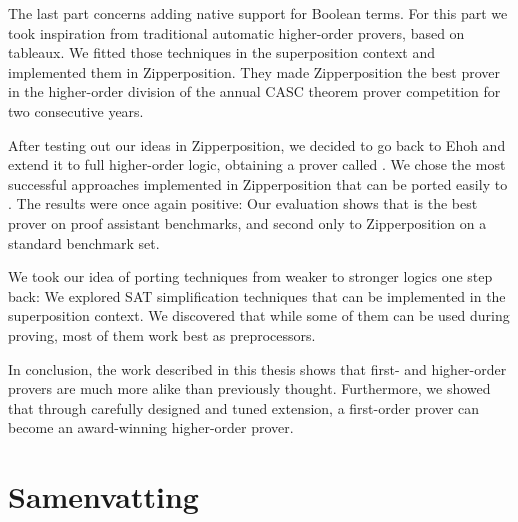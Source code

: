 The last part concerns adding native support for
Boolean terms. For this part we took inspiration from traditional
automatic higher-order provers, based on tableaux. We fitted those techniques in the
superposition context and implemented them in Zipperposition. They
made Zipperposition the best prover in the higher-order division of the annual CASC
theorem prover competition for two consecutive years.

After testing out our ideas in Zipperposition, we decided to go back to Ehoh and
extend it to full higher-order logic, obtaining a prover called \ehohii{}. We
chose the most successful approaches implemented in Zipperposition that can
be ported easily to \ehohii{}. The results were once again positive: Our
evaluation shows that \ehohii{} is the best prover on proof assistant
benchmarks, and second only to Zipperposition on a standard benchmark set.

We took our idea of porting techniques from weaker to stronger logics one step
back: We explored SAT simplification techniques that can be implemented in the
superposition context. We discovered that while some of them can be used during proving,
most of them work best as preprocessors.

In conclusion, the work described in this thesis shows that first- and
higher-order provers are much more alike than previously thought. Furthermore,
we showed that through carefully designed and tuned extension, a first-order
prover can become an award-winning higher-order prover.

\chapter*{Samenvatting}

